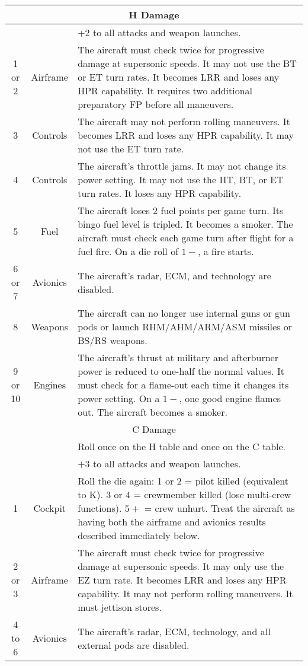 {\begin{twocolumntablefloat}
\begin{twocolumntable}
{\begin{tabularx}{\linewidth}{ccX}
\multicolumn{3}{c}{H Damage}\\
\midrule
&&+2 to all attacks and weapon launches.\\
\cmidrule{3-3}
1 or 2&Airframe&
The aircraft must check twice for progressive damage at supersonic speeds.
It may not use the BT or ET turn rates.
It becomes LRR and loses any HPR capability.
It requires two additional preparatory FP before all maneuvers.
\\
3&Controls&
The aircraft may not perform rolling maneuvers. 
It becomes LRR and loses any HPR capability.
It may not use the ET turn rate.
\\
4&Controls&
The aircraft's throttle jams. 
It may not change its power setting.
It may not use the HT, BT, or ET turn rates.
It loses any HPR capability.
\\
5&Fuel&
The aircraft loses 2 fuel points per game turn. 
Its bingo fuel level is tripled. 
It becomes a smoker.
The aircraft must check each game turn after flight for a fuel fire. On a die roll of $1-$, a fire starts.
\\
6 or 7&Avionics&
The aircraft's radar, ECM, and technology are disabled.
\\
8&Weapons&
The aircraft can no longer use internal guns or gun pods or launch RHM/AHM/ARM/ASM missiles or BS/RS weapons.
\\
9 or 10&Engines&
The aircraft's thrust at military and afterburner power is reduced to one-half the normal values.
It must check for a flame-out each time it changes its power setting. On a $1-$, one good engine flames out.
The aircraft becomes a smoker.
\\
\midrule
\multicolumn{3}{c}{C Damage}\\
\midrule
&&Roll once on the H table and once on the C table.\\
&&$+3$ to all attacks and weapon launches.\\
\cmidrule{3-3}
1&Cockpit&
Roll the die again: 1 or 2 = pilot killed (equivalent to K). 3 or 4 = crewmember killed (lose multi-crew functions). $5+$ = crew unhurt. 
Treat the aircraft as having both the airframe and avionics results described immediately below.
\\
2 or 3&Airframe&
The aircraft must check twice for progressive damage at supersonic speeds.
It may only use the EZ turn rate.
It becomes LRR and loses any HPR capability.
It may not perform rolling maneuvers. 
It must jettison stores.
\\
4 to 6&Avionics&
The aircraft's radar, ECM, technology, and all external pods are disabled.

\end{tabularx}}
\end{twocolumntable}
\end{twocolumntablefloat}}
